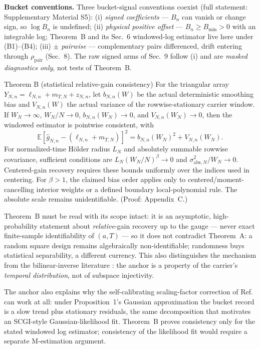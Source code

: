\noindent\textbf{Bucket conventions.} Three bucket-signal conventions coexist (full statement: Supplementary Material S5): (i) \emph{signed coefficients} --- $B_n$ can vanish or change sign, so $\log B_n$ is undefined; (ii) \emph{physical positive offset} --- $B_n\ge B_{\min}>0$ with an integrable log; Theorem~B and its Sec.~6 windowed-log estimator live here under (B1)--(B4); (iii) \emph{$\pm$ pairwise} --- complementary pairs differenced, drift entering through $\rho_{\mathrm{pair}}$ (Sec.~8). The raw signed arms of Sec.~9 follow (i) and are \emph{masked diagnostics only}, not tests of Theorem~B.

\begin{namedthm}{Theorem B (statistical relative-gain consistency)}
For the triangular array $Y_{N,n}=\ell_{N,n}+m_{T,N}+z_{N,n}$, let $b_{N,n}(W)$ be the actual deterministic smoothing bias and $V_{N,n}(W)$ the actual variance of the rowwise-stationary carrier window. If $W_N\to\infty$, $W_N/N\to0$, $b_{N,n}(W_N)\to0$, and $V_{N,n}(W_N)\to0$, then the windowed estimator is pointwise consistent, with
\[
\mathbb E[\hat g_{N,n}-(\ell_{N,n}+m_{T,N})]^2=b_{N,n}(W_N)^2+V_{N,n}(W_N).
\]
For normalized-time H\"older radius $L_N$ and absolutely summable rowwise covariance, sufficient conditions are $L_N(W_N/N)^\beta\to0$ and $\sigma_{\mathrm{abs},N}^2/W_N\to0$. Centered-gain recovery requires these bounds uniformly over the indices used in centering. For $\beta>1$, the claimed bias order applies only to centered/moment-cancelling interior weights or a defined boundary local-polynomial rule. The absolute scale remains unidentifiable. (Proof: Appendix~C.)
\end{namedthm}

Theorem~B must be read with its scope intact: it is an asymptotic, high-probability statement about \emph{relative}-gain recovery up to the gauge --- never exact finite-sample identifiability of $(a,T)$ --- so it does not contradict Theorem~A: a random square design remains algebraically non-identifiable; randomness buys statistical separability, a different currency. This also distinguishes the mechanism from the bilinear-inverse literature \cite{LiLeeBresler1501.06120,KechKrahmer1603.07316,ChoudharyMitra1402.2637}: the anchor is a property of the carrier's \emph{temporal distribution}, not of subspace injectivity.

The anchor also explains why the self-calibrating scaling-factor correction of Ref.~\cite{PengChen2024APL} can work at all: under Proposition~1's Gaussian approximation the bucket record is a slow trend plus stationary residuals, the same decomposition that motivates an SCGI-style Gaussian-likelihood fit. Theorem~B proves consistency only for the stated windowed log estimator; consistency of the likelihood fit would require a separate M-estimation argument.

